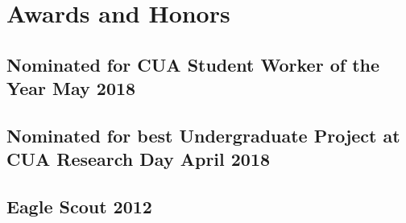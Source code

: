 \section{Awards and Honors}
\subsection{Nominated for CUA Student Worker of the Year \hfill May 2018}
\subsection{Nominated for best Undergraduate Project at CUA Research Day \hfill April 2018}
\subsection{Eagle Scout \hfill 2012}
